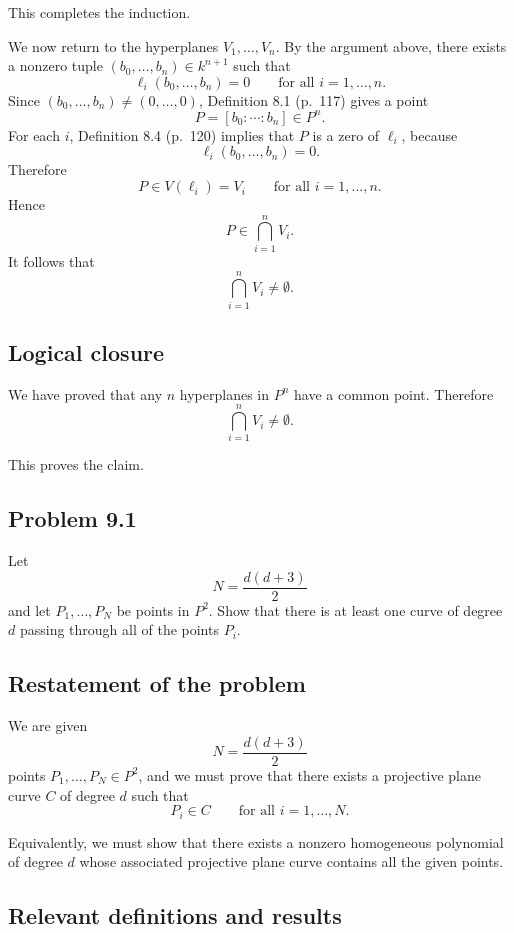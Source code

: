\documentclass[a4paper,12pt,openany]{article}
\theoremstyle{plain}
\theoremstyle{definition}
\theoremstyle{remark}
\begin{document}
This completes the induction.

\medskip

We now return to the hyperplanes $V_1,\dots,V_n$. By the argument above,
there exists a nonzero tuple $(b_0,\dots,b_n)\in k^{n+1}$ such that
\[
\ell_i(b_0,\dots,b_n)=0
\qquad\text{for all } i=1,\dots,n.
\]
Since $(b_0,\dots,b_n)\neq (0,\dots,0)$, Definition 8.1 (p.~117) gives a
point
\[
P=[b_0:\cdots:b_n]\in P^n.
\]
For each $i$, Definition 8.4 (p.~120) implies that $P$ is a zero of $\ell_i$,
because
\[
\ell_i(b_0,\dots,b_n)=0.
\]
Therefore
\[
P\in V(\ell_i)=V_i
\qquad\text{for all } i=1,\dots,n.
\]
Hence
\[
P\in \bigcap_{i=1}^n V_i.
\]
It follows that
\[
\bigcap_{i=1}^n V_i\neq\emptyset.
\]

\subsection*{Logical closure}

We have proved that any $n$ hyperplanes in $P^n$ have a common point.
Therefore
\[
\bigcap_{i=1}^n V_i\neq\emptyset.
\]

This proves the claim.



\subsection*{Problem 9.1}

Let
\[
N=\frac{d(d+3)}{2}
\]
and let $P_1,\dots,P_N$ be points in $P^2$. Show that there is at least one
curve of degree $d$ passing through all of the points $P_i$.

\subsection*{Restatement of the problem}

We are given
\[
N=\frac{d(d+3)}{2}
\]
points $P_1,\dots,P_N \in P^2$, and we must prove that there exists a
projective plane curve $C$ of degree $d$ such that
\[
P_i \in C \qquad \text{for all } i=1,\dots,N.
\]

Equivalently, we must show that there exists a nonzero homogeneous
polynomial of degree $d$ whose associated projective plane curve contains
all the given points.

\subsection*{Relevant definitions and results}
\end{document}
